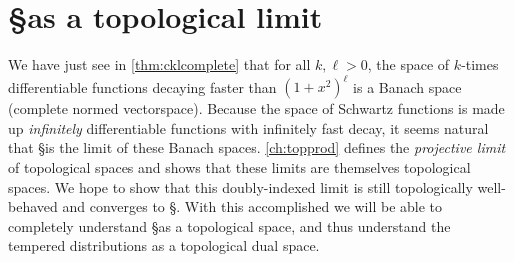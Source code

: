     \section{\S as a topological limit}
      
      We have just see in \cref{thm:cklcomplete} that for all $k,\ell>0$, the space \Ckl of $k$-times differentiable functions decaying faster than $(1+x^2)^\ell$ is a Banach space (complete normed vectorspace).
      Because the space of Schwartz functions is made up \emph{infinitely} differentiable functions with infinitely fast decay, it seems natural that \S is the limit of these Banach spaces.
      \cref{ch:topprod} defines the \emph{projective limit} of topological spaces and shows that these limits are themselves topological spaces.
      We hope to show that this doubly-indexed limit is still topologically well-behaved and converges to \S.
      With this accomplished we will be able to completely understand \S as a topological space, and thus understand the tempered distributions \SS as a topological dual space.

